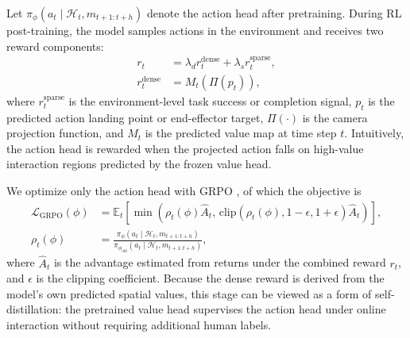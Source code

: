 Let $\pi_\phi(a_t \mid \mathcal{H}_t, m_{t+1:t+h})$ denote the action head after pretraining. During RL post-training, the model samples actions in the environment and receives two reward components:
\begin{equation}
\begin{aligned}
r_t &= \lambda_d r_t^{\mathrm{dense}} + \lambda_s r_t^{\mathrm{sparse}},\\
r_t^{\mathrm{dense}} &= M_t(\Pi(p_t)),
\end{aligned}
\end{equation}
where $r_t^{\mathrm{sparse}}$ is the environment-level task success or completion signal, $p_t$ is the predicted action landing point or end-effector target, $\Pi(\cdot)$ is the camera projection function, and $M_t$ is the predicted value map at time step $t$. Intuitively, the action head is rewarded when the projected action falls on high-value interaction regions predicted by the frozen value head.

We optimize only the action head with GRPO \cite{shao2024deepseekmath}, of which the objective is
\begin{equation}
\begin{aligned}
\mathcal{L}_{\mathrm{GRPO}}(\phi)
&=
\mathbb{E}_t \left[
\min\!\left(
\rho_t(\phi)\hat{A}_t,\,
\mathrm{clip}\!\left(\rho_t(\phi), 1-\epsilon, 1+\epsilon\right)\hat{A}_t
\right)
\right],\\
\rho_t(\phi)
&=
\frac{\pi_\phi(a_t \mid \mathcal{H}_t, m_{t+1:t+h})}
{\pi_{\phi_{\mathrm{old}}}(a_t \mid \mathcal{H}_t, m_{t+1:t+h})},
\end{aligned}
\end{equation}
where $\hat{A}_t$ is the advantage estimated from returns under the combined reward $r_t$, and $\epsilon$ is the clipping coefficient. Because the dense reward is derived from the model's own predicted spatial values, this stage can be viewed as a form of self-distillation: the pretrained value head supervises the action head under online interaction without requiring additional human labels.

